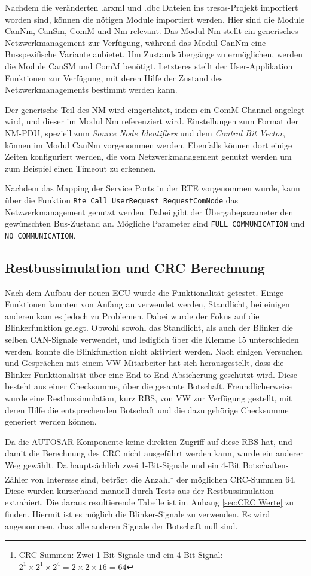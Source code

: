 \documentclass[
  a4paper,					    %
  twoside,
  DIV=calc,     				%
  bibliography=totoc,
  cleardoublepage=empty,
  ngerman,     					%
  final       					%
]{scrbook}
\begin{document}
Nachdem die veränderten .arxml und .dbc Dateien ins tresos-Projekt importiert worden sind, können die nötigen Module importiert werden. Hier sind die Module CanNm, CanSm, ComM und Nm relevant. Das Modul Nm stellt ein generisches Netzwerkmanagement zur Verfügung, während das Modul CanNm eine Busspezifische Variante anbietet. Um Zustandsübergänge zu ermöglichen, werden die Module CanSM und ComM benötigt. Letzteres stellt der User-Applikation Funktionen zur Verfügung, mit deren Hilfe der Zustand des Netzwerkmanagements bestimmt werden kann.

Der generische Teil des NM wird eingerichtet, indem ein ComM Channel angelegt wird, und dieser im Modul Nm referenziert wird. Einstellungen zum Format der NM-PDU, speziell zum \emph{Source Node Identifiers} und dem \emph{Control Bit Vector}, können im Modul CanNm vorgenommen werden. Ebenfalls können dort einige Zeiten konfiguriert werden, die vom Netzwerkmanagement genutzt werden um zum Beispiel einen Timeout zu erkennen.

Nachdem das Mapping der Service Ports in der RTE vorgenommen wurde, kann über die Funktion \texttt{Rte\_Call\_UserRequest\_RequestComNode} das Netzwerkmanagement genutzt werden. Dabei gibt der Übergabeparameter den gewünschten Bus-Zustand an. Mögliche Parameter sind \texttt{FULL\_COMMUNICATION} und \texttt{NO\_COMMUNICATION}.




\subsection{Restbussimulation und CRC Berechnung}
\label{sec:RBS}
Nach dem Aufbau der neuen ECU wurde die Funktionalität getestet. Einige Funktionen konnten von Anfang an verwendet werden, Standlicht, bei einigen anderen kam es jedoch zu Problemen. Dabei wurde der Fokus auf die Blinkerfunktion gelegt. Obwohl sowohl das Standlicht, als auch der Blinker die selben CAN-Signale verwendet, und lediglich über die Klemme 15 unterschieden werden, konnte die Blinkfunktion nicht aktiviert werden. Nach einigen Versuchen und Gesprächen mit einem VW-Mitarbeiter hat sich herausgestellt, dass die Blinker Funktionalität über eine End-to-End-Absicherung geschützt wird. Diese besteht aus einer Checksumme, über die gesamte Botschaft. Freundlicherweise wurde eine Restbussimulation, kurz RBS, von VW zur Verfügung gestellt, mit deren Hilfe die entsprechenden Botschaft und die dazu gehörige Checksumme generiert werden können. 

Da die AUTOSAR-Komponente keine direkten Zugriff auf diese RBS hat, und damit die Berechnung des CRC nicht ausgeführt werden kann, wurde ein anderer Weg gewählt. Da hauptsächlich zwei 1-Bit-Signale und ein 4-Bit Botschaften-Zähler von Interesse sind, beträgt die Anzahl\footnote{CRC-Summen: Zwei 1-Bit Signale und ein 4-Bit Signal: $ 2^1 \times 2^1 \times 2^4 = 2 \times 2 \times 16 = 64 $} der möglichen CRC-Summen 64. Diese wurden kurzerhand manuell durch Tests aus der Restbussimulation extrahiert. Die daraus resultierende Tabelle ist im Anhang \ref{sec:CRC Werte} zu finden. Hiermit ist es möglich die Blinker-Signale zu verwenden. Es wird angenommen, dass alle anderen Signale der Botschaft null sind.
\end{document}
